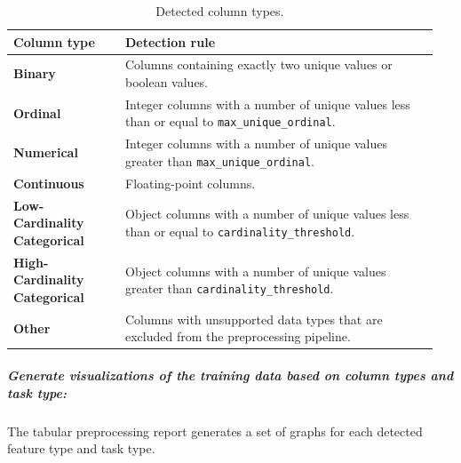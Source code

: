 \begin{table}[H]
\centering
\caption{Detected column types.}
\begin{tabular}{p{0.25\linewidth}p{0.70\linewidth}}
\toprule
\textbf{Column type} & \textbf{Detection rule}\\
\midrule
\textbf{Binary} & Columns containing exactly two unique values or boolean values.\\
\textbf{Ordinal} & Integer columns with a number of unique values less than or equal to \texttt{max\_unique\_ordinal}.\\
\textbf{Numerical} & Integer columns with a number of unique values greater than \texttt{max\_unique\_ordinal}.\\
\textbf{Continuous} & Floating-point columns.\\
\textbf{Low-Cardinality Categorical} & Object columns with a number of unique values less than or equal to \texttt{cardinality\_threshold}.\\
\textbf{High-Cardinality Categorical} & Object columns with a number of unique values greater than \texttt{cardinality\_threshold}.\\
\textbf{Other} & Columns with unsupported data types that are excluded from the preprocessing pipeline.\\
\bottomrule
\end{tabular}
\end{table}


\subparagraph{Generate visualizations of the training data based on column types and task type:}
The tabular preprocessing report generates a set of graphs for each detected feature type and task type. 

